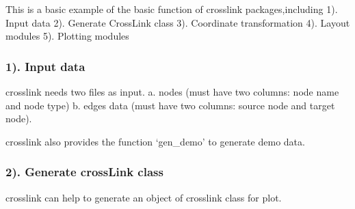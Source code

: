 \documentclass[
]{article}
\newenvironment{Shaded}{\begin{snugshade}}{\end{snugshade}}
\newcommand{\CommentTok}[1]{\textcolor[rgb]{0.56,0.35,0.01}{\textit{#1}}}
\newcommand{\DataTypeTok}[1]{\textcolor[rgb]{0.13,0.29,0.53}{#1}}
\newcommand{\DecValTok}[1]{\textcolor[rgb]{0.00,0.00,0.81}{#1}}
\newcommand{\KeywordTok}[1]{\textcolor[rgb]{0.13,0.29,0.53}{\textbf{#1}}}
\newcommand{\NormalTok}[1]{#1}
\newcommand{\OperatorTok}[1]{\textcolor[rgb]{0.81,0.36,0.00}{\textbf{#1}}}
\newcommand{\StringTok}[1]{\textcolor[rgb]{0.31,0.60,0.02}{#1}}
\begin{document}
This is a basic example of the basic function of crosslink
packages,including 1). Input data 2). Generate CrossLink class 3).
Coordinate transformation 4). Layout modules 5). Plotting modules

\hypertarget{input-data}{%
\subsubsection{1). Input data}\label{input-data}}

crosslink needs two files as input. a. nodes (must have two columns:
node name and node type) b. edges data (must have two columns: source
node and target node).

crosslink also provides the function `gen\_demo' to generate demo data.

\begin{Shaded}
\end{Shaded}

\hypertarget{generate-crosslink-class}{%
\subsubsection{2). Generate crossLink
class}\label{generate-crosslink-class}}

crosslink can help to generate an object of crosslink class for plot.

\begin{Shaded}
\end{Shaded}
\end{document}
